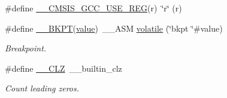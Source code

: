 \begin{DoxyCompactItemize}
\#define \hyperlink{group___c_m_s_i_s___core___instruction_interface_ga9d94dee7402367961d2cf0accc00fd97}{\+\_\+\+\_\+\+C\+M\+S\+I\+S\+\_\+\+G\+C\+C\+\_\+\+U\+S\+E\+\_\+\+R\+EG}(r)~\char`\"{}r\char`\"{} (r)
\item 
\#define \hyperlink{group___c_m_s_i_s___core___instruction_interface_ga15ea6bd3c507d3e81c3b3a1258e46397}{\+\_\+\+\_\+\+B\+K\+PT}(\hyperlink{semihosting_8h_aacce635d68067370c70caa2381ea1040}{value})~\+\_\+\+\_\+\+A\+SM \hyperlink{semihosting_8h_a65e6ad7ed1b130fda2cf7f6a0861fca9}{volatile} (\char`\"{}bkpt \char`\"{}\#value)
\begin{DoxyCompactList}\small\item\em Breakpoint. \end{DoxyCompactList}\item 
\#define \hyperlink{group___c_m_s_i_s___core___instruction_interface_ga5d5bb1527e042be4a9fa5a33f65cc248}{\+\_\+\+\_\+\+C\+LZ}~\+\_\+\+\_\+builtin\+\_\+clz
\begin{DoxyCompactList}\small\item\em Count leading zeros. \end{DoxyCompactList}\end{DoxyCompactItemize}
